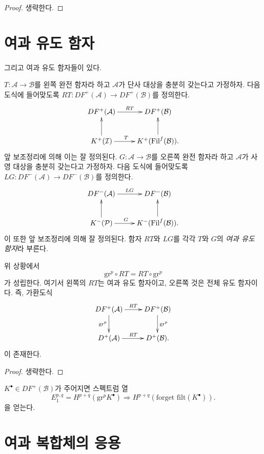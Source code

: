 \begin{proof}
생략한다.
\end{proof}
\section{여과 유도 함자}
\label{section-filtered-derived-functors}

\noindent
그리고 여과 유도 함자들이 있다.

\begin{definition}
\label{definition-filtered-derived-functors}
$T: \mathcal{A} \to \mathcal{B}$를 왼쪽 완전 함자라 하고
$\mathcal{A}$가 단사 대상을 충분히 갖는다고 가정하자. 다음 도식에
들어맞도록 $RT: DF^+(\mathcal{A}) \to D
F^+(\mathcal{B})$를 정의한다.
$$
\xymatrix{
DF^+(\mathcal{A}) \ar[r]^{RT} & DF^+(\mathcal{B}) \\
K^+(\mathcal{I}) \ar[u] \ar[r]^{T \quad} & K^+(\text{Fil}^f(\mathcal{B})).
\ar[u]}
$$
앞 보조정리에 의해 이는 잘 정의된다. $G: \mathcal{A} \to
\mathcal{B}$를 오른쪽 완전 함자라 하고 $\mathcal{A}$가 사영 대상을
충분히 갖는다고 가정하자. 다음 도식에 들어맞도록
$LG: DF^-(\mathcal{A}) \to DF^-(\mathcal{B})$를 정의한다.
$$
\xymatrix{
DF^-(\mathcal{A}) \ar[r]^{LG} & DF^-(\mathcal{B}) \\
K^-(\mathcal{P}) \ar[u] \ar[r]^{G \quad} & K^-(\text{Fil}^f(\mathcal{B})).
\ar[u]}
$$
이 또한 앞 보조정리에 의해 잘 정의된다. 함자 $RT$와 $LG$를 각각
$T$와 $G$의 {\it 여과 유도 함자}라 부른다.
\end{definition}

\begin{proposition}
\label{proposition-compare-filtered-graded}
위 상황에서
$$
\text{gr}^p \circ RT = RT \circ \text{gr}^p
$$
가 성립한다. 여기서 왼쪽의 $RT$는 여과 유도 함자이고, 오른쪽 것은
전체 유도 함자이다. 즉, 가환도식
$$
\xymatrix{
DF^+(\mathcal{A}) \ar[r]^{RT} \ar[d]_{\text{gr}^p} & DF^+(\mathcal{B})
\ar[d]^{\text{gr}^p}\\
D^+(\mathcal{A}) \ar[r]^{RT} & D^+(\mathcal{B}).}
$$
이 존재한다.
\end{proposition}

\begin{proof}
생략한다.
\end{proof}

\noindent
$K^\bullet \in DF^+(\mathcal{B})$가 주어지면 스펙트럼 열
$$
E_1^{p, q} = H^{p+q}(\text{gr}^p K^\bullet) \Rightarrow H^{p+q}(\text{forget
filt}(K^\bullet)).
$$
을 얻는다.

\section{여과 복합체의 응용}
\label{section-applications-filtered}

